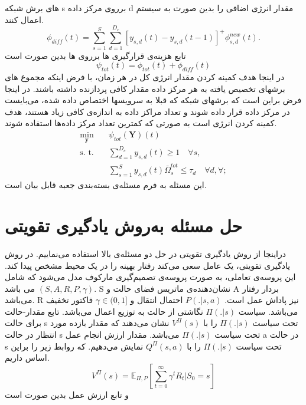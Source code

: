  های 
برش شبکه s برروی مرکز داده d مقدار انرژی اضافی را بدین صورت به سیستم اعمال کنند.
\begin{equation*}
	\textstyle \phi_{diff}(t) = \sum_{s=1}^{S}\sum_{d=1}^{D_c}[y_{s,d}(t)-y_{s,d}(t-1)]^+\phi_{s,d}^{new}(t).
\end{equation*}
تابع هزینه‌ی قرارگیری 
ها
 برروی
ها 
 بدین صورت است
\begin{equation}\label{eqpsi}
	\textstyle  \psi_{tot}(t) = \phi_{tot}(t) + \phi_{diff}(t)
\end{equation}
در اینجا هدف کمینه کردن مقدار انرژی کل در هر زمان، با فرض اینکه مجموع
 های 
 برشهای تخصیص یافته به هر مرکز داده مقدار کافی پردازنده داشته باشند. در اینجا فرض براین است که برشهای شبکه که قبلا به سرویسها اختصاص داده شده، می‌بایست در مرکز داده قرار داده شوند و تعداد مراکز داده به اندازه‌ی کافی زیاد هستند، هدف کمینه کردن انرژی است به صورتی که کمترین تعداد مرکز داده‌ها استفاده شوند.
\begin{subequations}
	\begin{alignat}{4}
		\min\limits_{\boldsymbol{y} }   \quad &   \psi_{tot}(\boldsymbol{Y})(t)\\
		\text{s. t.} \quad & \textstyle \sum_{d=1}^{D_c} y_{s,d}(t) \geq 1 \quad \forall s, \\
		&\textstyle  \sum_{s=1}^{S} y_{s,d}(t) \bar{\Omega}_{s}^{tot}  \leq   \tau_{d} \quad  \forall d, \forall ;  \label{eqomega}
	\end{alignat}
\end{subequations}
این مسئله به فرم مسئله‌ی بسته‌بندی جعبه قابل بیان است.
\section{حل مسئله به‌روش یادگیری تقویتی}
دراینجا از روش یادگیری تقویتی در حل دو مسئله‌ی بالا استفاده می‌نماییم.
در روش یادگیری تقویتی، یک عامل سعی می‌کند رفتار بهینه را در یک محیط مشخص پیدا کند. این پروسه‌ی تعاملی، به صورت پروسه‌ی تصمیم‌گیری مارکوف مدل می‌شود که شامل $(S,A,R,P,\gamma)$  می باشد.
S
نشان‌دهنده‌ی ماتریس فضای حالت و A بردار رفتار می‌باشد. R نیز پاداش عمل است. 
$P(.|s,a)$
احتمال انتقال و
 $\gamma \in (0,1]$
 فاکتور تخفیف می‌باشد.
 سیاست 
$\Pi(.|s)$
نگاشتی از حالت به توزیع اعمال می‌باشد.
تابع مقدار-حالت برای حالت s تحت سیاست $\Pi(.|s)$ را با  
$V^{\Pi}(s)$
نشان می‌دهند که مقدار بازده مورد انتظار در حالت s تحت سیاست $\Pi(.|s)$
می‌باشد. مقدار ارزش انجام عمل a در حالت s تحت سیاست $\Pi(.|s)$ 
را با
 $Q^{\Pi}(s,a)$
 نمایش می‌دهیم.
 که روابط زیر را براین اساس داریم.
 \begin{equation}
	V^{\Pi}(s) = \mathbb{E}_{\Pi,P}[\sum_{t=0}^{\infty}\gamma^tR_t|S_0=s]
 \end{equation}
و تابع ارزش عمل بدین صورت است

